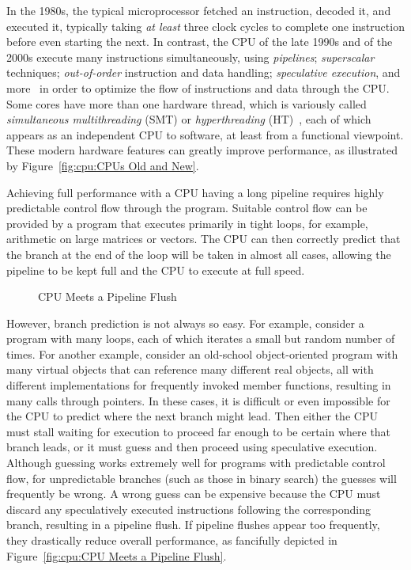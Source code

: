 In the 1980s, the typical microprocessor fetched an instruction, decoded
it, and executed it, typically taking \emph{at least} three clock cycles
to complete one instruction before even starting the next.
In contrast, the CPU of the late 1990s and of the 2000s execute many
instructions simultaneously, using \emph{pipelines}; \emph{superscalar}
techniques; \emph{out-of-order} instruction and data handling;
\emph{speculative execution}, and
more~\cite{Hennessy2011}
in order to optimize the flow of instructions and data through the CPU.
Some cores have more than one hardware thread, which is variously called
\emph{simultaneous multithreading} (SMT) or \emph{hyperthreading}
(HT)~\cite{JFennel1973SMT},
each of which appears as
an independent CPU to software, at least from a functional viewpoint.
These modern hardware features can greatly improve performance, as
illustrated by Figure~\ref{fig:cpu:CPUs Old and New}.

Achieving full performance with a CPU having a long pipeline requires
highly predictable control flow through the program.
Suitable control flow can be provided by a program that executes primarily
in tight loops, for example, arithmetic on large matrices or vectors.
The CPU can then correctly predict that the branch at the end of the loop
will be taken in almost all cases,
allowing the pipeline to be kept full and the CPU to execute at full speed.

\begin{figure}[tb]
\centering
{}
\caption{CPU Meets a Pipeline Flush}
\end{figure}

However, branch prediction is not always so easy.
For example, consider a program with many loops, each of which iterates
a small but random number of times.
For another example, consider an old-school object-oriented program with
many virtual objects that can reference many different real objects, all
with different implementations for frequently invoked member functions,
resulting in many calls through pointers.
In these cases, it is difficult or even
impossible for the CPU to predict where the next branch might lead.
Then either the CPU must stall waiting for execution to proceed far
enough to be certain where that branch leads, or it must guess and
then proceed using speculative execution.
Although guessing works extremely well for programs with predictable
control flow, for unpredictable branches (such as those in binary search)
the guesses will frequently be wrong.
A wrong guess can be expensive because the CPU must discard any
speculatively executed instructions following the corresponding
branch, resulting in a pipeline flush.
If pipeline flushes appear too frequently, they drastically reduce
overall performance, as fancifully depicted in
Figure~\ref{fig:cpu:CPU Meets a Pipeline Flush}.

